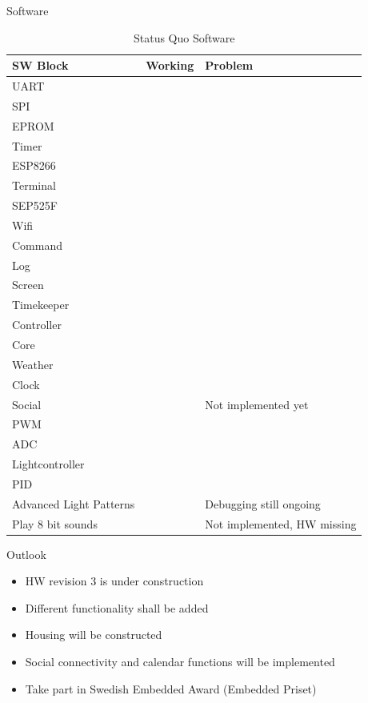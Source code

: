 \documentclass[apectratio=169]{beamer}
\begin{document}
	\begin{frame}{Software}
	\tiny
		\begin{table}[H] \centering \begin{tabularx}{\textwidth}{llX}
			\textbf{SW Block} & \textbf{Working}& \textbf{Problem}
			\\\hline UART & \checkmark & \\ SPI & \checkmark & \\
			EPROM & \checkmark & \\ Timer & \checkmark & \\	ESP8266
			& \checkmark & \\ Terminal & \checkmark & \\ SEP525F &
			\checkmark & \\ Wifi & \checkmark & \\ Command &
			\checkmark & \\ Log & \checkmark & \\ Screen &
			\checkmark & \\ Timekeeper & \checkmark & \\ Controller
			& & \\ Core & \checkmark & \\ Weather & \checkmark & \\
			Clock & \checkmark & \\ Social & & Not implemented yet
			\\ PWM & \checkmark & \\ ADC & \checkmark & \\
			Lightcontroller & \checkmark & \\ PID & \checkmark & \\
			Advanced Light Patterns & & Debugging still ongoing\\
		Play 8 bit sounds & & Not implemented, HW missing\\ \hline
		\end{tabularx} \caption{Status Quo Software}
	\label{tab:sw_status_quo} \end{table}
	\end{frame}
	
  	\begin{frame}{Outlook}	
		\begin{itemize}
			\item<1-> HW revision 3 is under construction
			\item<2-> Different functionality shall be added
			\item<3-> Housing will be constructed
			\item<4-> Social connectivity and calendar functions will be implemented
			\item<5-> Take part in Swedish Embedded Award (Embedded
				Priset)
		\end{itemize}
	\end{frame}
\end{document}
